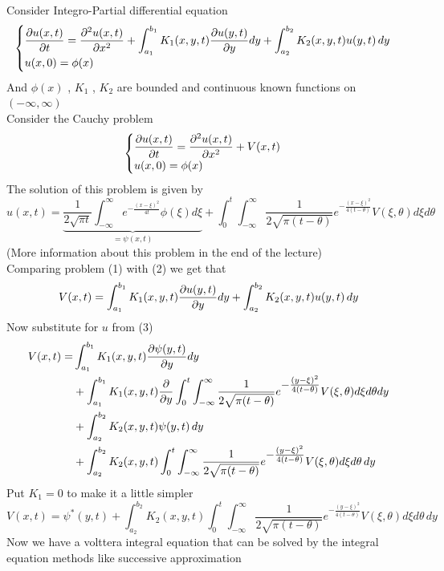 \begin{example}
    Consider Integro-Partial differential equation
    \begin{equation}
        \begin{cases}
                \displaystyle \pdv{u(x,t)}{t}=\pdv[2]{u(x,t)}{x} + \int_{a_1}^{b_1} K_1(x,y,t) \pdv{u(y,t)}{y} dy + \int_{a_2}^{b_2}K_2(x,y,t)u(y,t) \, dy
                \\
                u(x,0)=\phi(x)
        \end{cases}
    \end{equation}
    And $\phi(x)$ , $K_1$ , $K_2$ are bounded and continuous known functions on $(-\infty,\infty)$
    \\
    Consider the Cauchy problem 
    \begin{equation}
        \begin{cases}
                \displaystyle \pdv{u(x,t)}{t}=\pdv[2]{u(x,t)}{x} + V(x,t)
                \\
                u(x,0)=\phi(x)
        \end{cases}
    \end{equation}
    The solution of this problem is given by 
    \begin{equation}
        u(x,t) = \underbrace{\frac{1}{2\sqrt{\pi t}}\int_{-\infty}^{\infty}e^{\textstyle -\frac{{(x-\xi)}^2}{4t}} \phi(\xi)d\xi}_{= \psi(x,t)} 
    + \int_{0}^{t} \int_{-\infty}^{\infty}\frac{1}{2\sqrt{\pi (t-\theta)}} e^{\textstyle -\frac{{(x-\xi)}^2}{4(t-\theta)}} V(\xi,\theta)d\xi d\theta
    \end{equation}
    (More information about this problem in the end of the lecture)
    \\
    Comparing problem (1) with (2) we get that  
    \[
        V(x,t) = \int_{a_1}^{b_1} K_1(x,y,t) \pdv{u(y,t)}{y} dy + \int_{a_2}^{b_2}K_2(x,y,t)u(y,t) \, dy
    \]
    Now substitute for $u$ from (3)
    \begin{align*}
        V(x,t) =& \int_{a_1}^{b_1} K_1(x,y,t) \pdv{\psi(y,t)}{y} dy 
                \\
                &+ \int_{a_1}^{b_1} K_1(x,y,t) \pdv{}{y} \int_{0}^{t} \int_{-\infty}^{\infty}\frac{1}{2\sqrt{\pi (t-\theta)}} e^{\textstyle -\frac{{(y-\xi)}^2}{4(t-\theta)}} V(\xi,\theta)d\xi d\theta dy 
                \\
                &+ \int_{a_2}^{b_2}K_2(x,y,t) \psi(y,t) \, dy
                \\
                &+ \int_{a_2}^{b_2}K_2(x,y,t) \int_{0}^{t} \int_{-\infty}^{\infty}\frac{1}{2\sqrt{\pi (t-\theta)}} e^{\textstyle -\frac{{(y-\xi)}^2}{4(t-\theta)}} V(\xi,\theta)d\xi d\theta \, dy
    \end{align*}
    Put $K_1 = 0 $ to make it a little simpler
    \[
        V(x,t) = \psi^*(y,t) + \int_{a_2}^{b_2}K_2(x,y,t) \int_{0}^{t} \int_{-\infty}^{\infty}\frac{1}{2\sqrt{\pi (t-\theta)}} e^{\textstyle -\frac{{(y-\xi)}^2}{4(t-\theta)}} V(\xi,\theta)d\xi d\theta \, dy    
    \]
    Now we have a volttera integral equation that can be solved by the integral equation methods like successive approximation
\end{example}


